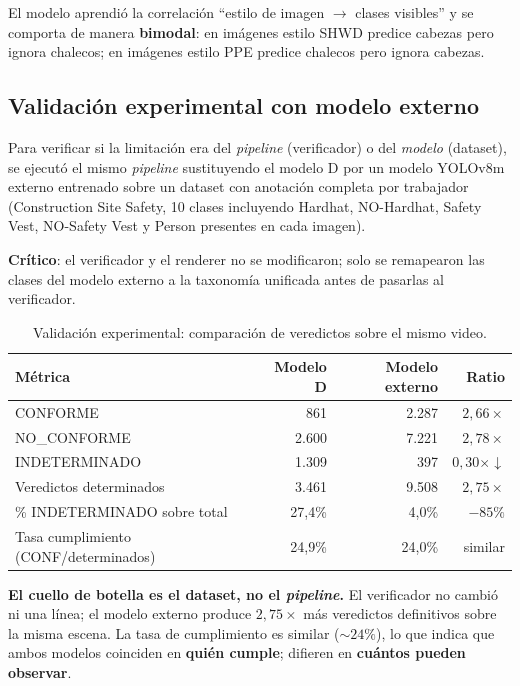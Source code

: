 \documentclass[11pt,a4paper]{article}
\begin{document}
El modelo aprendió la correlación ``estilo de imagen $\to$ clases
visibles'' y se comporta de manera \textbf{bimodal}: en imágenes
estilo SHWD predice cabezas pero ignora chalecos; en imágenes
estilo PPE predice chalecos pero ignora cabezas.

\subsection{Validación experimental con modelo externo}

Para verificar si la limitación era del \emph{pipeline} (verificador)
o del \emph{modelo} (dataset), se ejecutó el mismo \emph{pipeline}
sustituyendo el modelo D por un modelo YOLOv8m externo entrenado sobre
un dataset con anotación completa por trabajador (Construction Site
Safety, 10 clases incluyendo Hardhat, NO-Hardhat, Safety Vest,
NO-Safety Vest y Person presentes en cada imagen).

\textbf{Crítico}: el verificador y el renderer no se modificaron; solo
se remapearon las clases del modelo externo a la taxonomía unificada
antes de pasarlas al verificador.

\begin{table}[H]
\centering
\caption{Validación experimental: comparación de veredictos sobre el
mismo video.}
\begin{tabular}{l r r r}
\toprule
\textbf{Métrica} & \textbf{Modelo D} & \textbf{Modelo externo} & \textbf{Ratio} \\
\midrule
CONFORME & 861 & 2.287 & $2{,}66\times$ \\
NO\_CONFORME & 2.600 & 7.221 & $2{,}78\times$ \\
INDETERMINADO & 1.309 & 397 & $0{,}30\times \downarrow$ \\
Veredictos determinados & 3.461 & 9.508 & \textbf{$2{,}75\times$} \\
\% INDETERMINADO sobre total & 27{,}4\% & 4{,}0\% & $-85\%$ \\
Tasa cumplimiento (CONF/determinados) & 24{,}9\% & 24{,}0\% & similar \\
\bottomrule
\end{tabular}
\end{table}

\begin{hallazgo}
\textbf{El cuello de botella es el dataset, no el \textit{pipeline}.}
El verificador no cambió ni una línea; el modelo externo produce
$2{,}75 \times$ más veredictos definitivos sobre la misma escena.
La tasa de cumplimiento es similar ($\sim 24\%$), lo que indica que
ambos modelos coinciden en \textbf{quién cumple}; difieren en
\textbf{cuántos pueden observar}.
\end{hallazgo}
\end{document}
